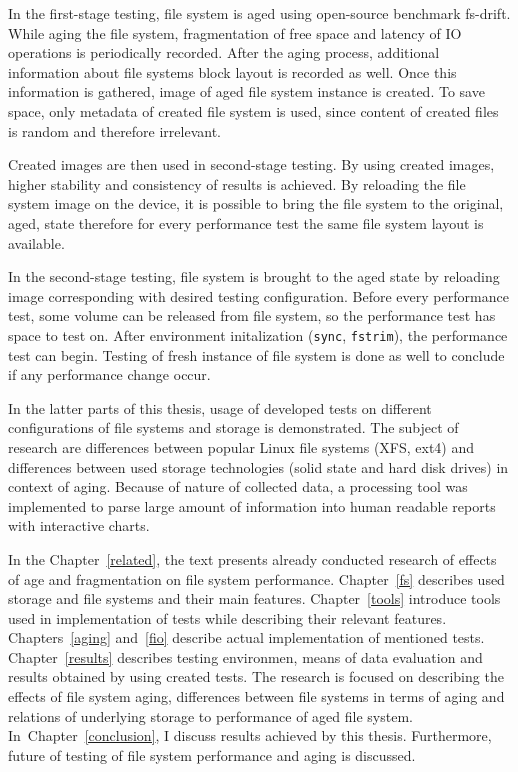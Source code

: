 \documentclass[
  color, %
  table, %
  lof,   %
  lot,   %
]{fithesis3}
\begin{document}
In the first-stage testing, file system is aged using open-source benchmark fs-drift. While aging the file system, fragmentation of free space and latency of IO operations is periodically recorded. After the aging process, additional information about file systems block layout is recorded as well. Once this information is gathered, image of aged file system instance is created. To save space, only metadata of created file system is used, since content of created files is random and therefore irrelevant.

Created images are then used in second-stage testing. By using created images, higher stability and consistency of results is achieved. By reloading the file system image on the device, it is possible to bring the file system to the original, aged, state therefore for every performance test the same file system layout is available.

In the second-stage testing, file system is brought to the aged state by reloading image corresponding with desired testing configuration. Before every performance test, some volume can be released from file system, so the performance test has space to test on. After environment initalization (\texttt{sync}, \texttt{fstrim}), the performance test can begin. Testing of fresh instance of file system is done as well to conclude if any performance change occur.

In the latter parts of this thesis, usage of developed tests on different configurations of file systems and storage is demonstrated. The subject of research are differences between popular Linux file systems (XFS, ext4) and differences between used storage technologies (solid state and hard disk drives) in context of aging. Because of nature of collected data, a processing tool was implemented to parse large amount of information into human readable reports with interactive charts.\footnotemark[1]


In the Chapter~\ref{related}, the text presents already conducted research of effects of age and fragmentation on file system performance. Chapter~\ref{fs} describes used storage and file systems and their main features. Chapter~\ref{tools} introduce tools used in implementation of tests while describing their relevant features. Chapters~\ref{aging} and~\ref{fio} describe actual implementation of mentioned tests. Chapter~\ref{results} describes testing environmen, means of data evaluation and results obtained by using created tests. The research is focused on describing the effects of file system aging, differences between file systems in terms of aging and relations of underlying storage to performance of aged file system. In~Chapter~\ref{conclusion}, I discuss results achieved by this thesis. Furthermore, future of testing of file system performance and aging is discussed.
\end{document}
